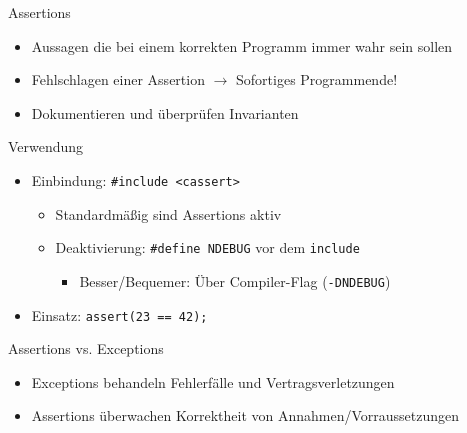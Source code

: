 \begin{frame}[fragile]{Assertions}
	\begin{itemize}
		\item Aussagen die bei einem korrekten Programm immer wahr sein sollen
		\item Fehlschlagen einer Assertion $\rightarrow$ Sofortiges Programmende!
		\item Dokumentieren und überprüfen Invarianten
	\end{itemize}
	
	\begin{block}{Verwendung}
		\begin{itemize}
			\item Einbindung: \verb|#include <cassert>|
			\begin{itemize}
				\item Standardmäßig sind Assertions aktiv
				\item Deaktivierung: \verb|#define NDEBUG| vor dem \verb|include|
				\begin{itemize}
					\item[] Besser/Bequemer: Über Compiler-Flag (\verb|-DNDEBUG|)
				\end{itemize}
			\end{itemize}
			\item Einsatz: \verb|assert(23 == 42);|
		\end{itemize}
	\end{block}
	
	\begin{block}{Assertions vs. Exceptions}
		\begin{itemize}
			\item Exceptions behandeln Fehlerfälle und Vertragsverletzungen
			\item Assertions überwachen Korrektheit von Annahmen/Vorraussetzungen
		\end{itemize}
	\end{block}
\end{frame}

